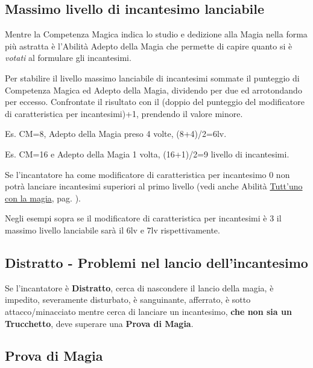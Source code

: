 \begin{multicols}{2}
\subsection{Massimo livello di incantesimo lanciabile}\hypertarget{scuoleelivelli}{}\label{magieaccessoallelistedimagia}\label{scuoleelivelli}

Mentre la Competenza Magica indica lo studio e dedizione alla Magia nella forma più astratta è l'Abilità Adepto della Magia che permette di capire quanto si è \emph{votati} al formulare gli incantesimi.

Per stabilire il livello massimo lanciabile di incantesimi sommate il punteggio di Competenza Magica ed Adepto della Magia, dividendo per due ed arrotondando per eccesso. Confrontate il risultato con il (doppio del punteggio del modificatore di caratteristica per incantesimi)+1, prendendo il valore minore.

Es. CM=8, Adepto della Magia preso 4 volte, (8+4)/2=6lv.

Es. CM=16 e Adepto della Magia 1 volta, (16+1)/2=9 livello di incantesimi.

Se l'incantatore ha come modificatore di caratteristica per incantesimo 0 non potrà lanciare incantesimi superiori al primo livello (vedi anche Abilità \hyperlink{Tutt'uno con la magia}{Tutt'uno con la magia}, pag. \pageref{Tutt'uno con la magia}).

Negli esempi sopra se il modificatore di caratteristica per incantesimi è 3 il massimo livello lanciabile sarà il 6lv e 7lv rispettivamente.

\subsection{Distratto - Problemi nel lancio dell'incantesimo}\label{magiedistratto}

Se l'incantatore è \textbf{Distratto}, cerca di nascondere il lancio della magia, è impedito, severamente disturbato, è sanguinante, afferrato, è sotto attacco/minacciato mentre cerca di lanciare un incantesimo, \textbf{che non sia un Trucchetto}, deve superare una \textbf{Prova di Magia}.

\subsection{Prova di Magia}\label{magieprovadimagia}


\end{multicols}
